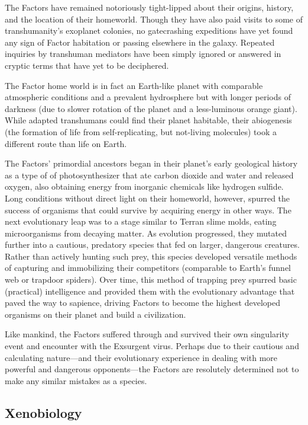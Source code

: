 The Factors have remained notoriously tight-lipped 
about their origins, history, and the location of their 
homeworld. Though they have also paid visits to some 
of transhumanity's exoplanet colonies, no gatecrashing 
expeditions have yet found any sign of Factor habitation 
or passing elsewhere in the galaxy. Repeated inquiries 
by transhuman mediators have been simply ignored or 
answered in cryptic terms that have yet to be deciphered.

The Factor home world is in fact an Earth-like 
planet with comparable atmospheric conditions and 
a prevalent hydrosphere but with longer periods of 
darkness (due to slower rotation of the planet and a 
less-luminous orange giant). While adapted transhumans
could find their planet habitable, their abiogenesis
(the formation of life from self-replicating, but
not-living molecules) took a different route than life 
on Earth. 

The Factors' primordial ancestors began in their 
planet's early geological history as a type of of photosynthesizer
that ate carbon dioxide and water and
released oxygen, also obtaining energy from inorganic 
chemicals like hydrogen sulfide. Long conditions 
without direct light on their homeworld, however, 
spurred the success of organisms that could survive 
by acquiring energy in other ways. The next evolutionary
leap was to a stage similar to Terran slime
molds, eating microorganisms from decaying matter. 
As evolution progressed, they mutated further into a 
cautious, predatory species that fed on larger, dangerous
creatures. Rather than actively hunting such prey,
this species developed versatile methods of capturing 
and immobilizing their competitors (comparable to 
Earth's funnel web or trapdoor spiders). Over time, 
this method of trapping prey spurred basic (practical) 
intelligence and provided them with the evolutionary 
advantage that paved the way to sapience, driving 
Factors to become the highest developed organisms 
on their planet and build a civilization. 

Like mankind, the Factors suffered through and 
survived their own singularity event and encounter 
with the Exsurgent virus. Perhaps due to their cautious
and calculating nature—and their evolutionary
experience in dealing with more powerful and dangerous
opponents—the Factors are resolutely determined
not to make any similar mistakes as a species. 

\subsection{Xenobiology }

